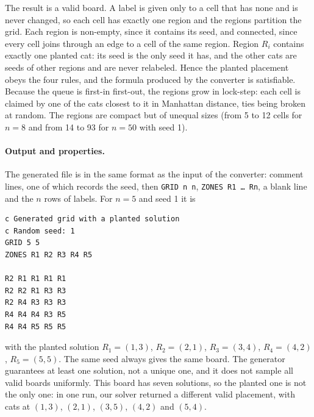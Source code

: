 The result is a valid board. A label is given only to a cell that has none and is never changed, so each cell has exactly one region and the regions partition the grid. Each region is non-empty, since it contains its seed, and connected, since every cell joins through an edge to a cell of the same region. Region $R_i$ contains exactly one planted cat: its seed is the only seed it has, and the other cats are seeds of other regions and are never relabeled. Hence the planted placement obeys the four rules, and the formula produced by the converter is satisfiable. Because the queue is first-in first-out, the regions grow in lock-step: each cell is claimed by one of the cats closest to it in Manhattan distance, ties being broken at random. The regions are compact but of unequal sizes (from 5 to 12 cells for $n=8$ and from 14 to 93 for $n=50$ with seed 1).

\paragraph{Output and properties.}
The generated file is in the same format as the input of the converter: comment lines, one of which records the seed, then \texttt{GRID n n}, \texttt{ZONES R1 \ldots{} Rn}, a blank line and the $n$ rows of labels. For $n=5$ and seed 1 it is
\begin{verbatim}
c Generated grid with a planted solution
c Random seed: 1
GRID 5 5
ZONES R1 R2 R3 R4 R5

R2 R1 R1 R1 R1
R2 R2 R1 R3 R3
R2 R4 R3 R3 R3
R4 R4 R4 R3 R5
R4 R4 R5 R5 R5
\end{verbatim}
with the planted solution $R_1=(1,3)$, $R_2=(2,1)$, $R_3=(3,4)$, $R_4=(4,2)$, $R_5=(5,5)$. The same seed always gives the same board. The generator guarantees at least one solution, not a unique one, and it does not sample all valid boards uniformly. This board has seven solutions, so the planted one is not the only one: in one run, our solver returned a different valid placement, with cats at $(1,3)$, $(2,1)$, $(3,5)$, $(4,2)$ and $(5,4)$.
